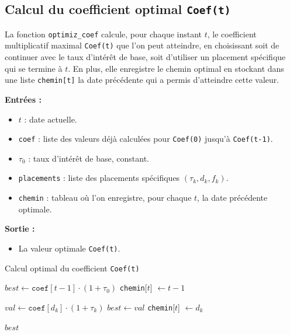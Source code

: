 \documentclass[a4paper,11pt]{article}
\begin{document}
\subsection{Calcul du coefficient optimal \texttt{Coef(t)}}

La fonction \texttt{optimiz\_coef} calcule, pour chaque instant $t$, le coefficient multiplicatif maximal \texttt{Coef(t)} que l’on peut atteindre, en choisissant soit de continuer avec le taux d’intérêt de base, soit d’utiliser un placement spécifique qui se termine à $t$.  
En plus, elle enregistre le chemin optimal en stockant dans une liste \texttt{chemin[t]} la date précédente qui a permis d’atteindre cette valeur.

\vspace{0.3cm}

\noindent \textbf{Entrées :}
\begin{itemize}
	\item $t$ : date actuelle.
	\item \texttt{coef} : liste des valeurs déjà calculées pour \texttt{Coef(0)} jusqu’à \texttt{Coef(t-1)}.
	\item $\tau_0$ : taux d’intérêt de base, constant.
	\item \texttt{placements} : liste des placements spécifiques $(\tau_k, d_k, f_k)$.
	\item \texttt{chemin} : tableau où l’on enregistre, pour chaque $t$, la date précédente optimale.
\end{itemize}

\noindent \textbf{Sortie :}
\begin{itemize}
	\item La valeur optimale \texttt{Coef(t)}.
\end{itemize}

\begin{algorithm}[H]
	\caption{Calcul optimal du coefficient \texttt{Coef(t)}}
	\begin{algorithmic}[1]
		\State $best \gets \texttt{coef}[t-1] \cdot (1 + \tau_0)$ 
		\State \texttt{chemin}[$t$] $\gets t - 1$ 
		
		 
		\State $val \gets \texttt{coef}[d_k] \cdot (1 + \tau_k)$
		\State $best \gets val$
		\State \texttt{chemin}[$t$] $\gets d_k$ 
		\EndIf
		\EndIf
		\EndFor
		
		\State \Return $best$
		\EndFunction
	\end{algorithmic}
\end{algorithm}
\end{document}
